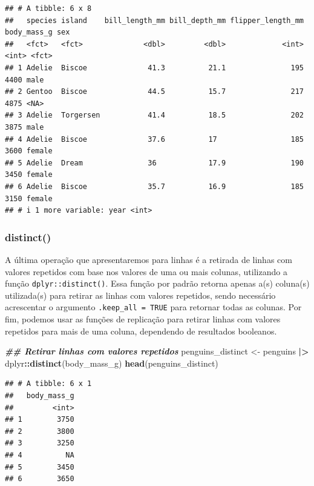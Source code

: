 \documentclass[
]{article}
\newenvironment{Shaded}{\begin{snugshade}}{\end{snugshade}}
\newcommand{\DocumentationTok}[1]{\textcolor[rgb]{0.56,0.35,0.01}{\textbf{\textit{#1}}}}
\newcommand{\FunctionTok}[1]{\textcolor[rgb]{0.13,0.29,0.53}{\textbf{#1}}}
\newcommand{\NormalTok}[1]{#1}
\newcommand{\OtherTok}[1]{\textcolor[rgb]{0.56,0.35,0.01}{#1}}
\newcommand{\SpecialCharTok}[1]{\textcolor[rgb]{0.81,0.36,0.00}{\textbf{#1}}}
\begin{document}
\begin{verbatim}
## # A tibble: 6 x 8
##   species island    bill_length_mm bill_depth_mm flipper_length_mm body_mass_g sex   
##   <fct>   <fct>              <dbl>         <dbl>             <int>       <int> <fct> 
## 1 Adelie  Biscoe              41.3          21.1               195        4400 male  
## 2 Gentoo  Biscoe              44.5          15.7               217        4875 <NA>  
## 3 Adelie  Torgersen           41.4          18.5               202        3875 male  
## 4 Adelie  Biscoe              37.6          17                 185        3600 female
## 5 Adelie  Dream               36            17.9               190        3450 female
## 6 Adelie  Biscoe              35.7          16.9               185        3150 female
## # i 1 more variable: year <int>
\end{verbatim}

\hypertarget{distinct}{%
\subsubsection{distinct()}\label{distinct}}

A última operação que apresentaremos para linhas é a retirada de linhas com valores repetidos com base nos valores de uma ou mais colunas, utilizando a função \texttt{dplyr::distinct()}. Essa função por padrão retorna apenas a(s) coluna(s) utilizada(s) para retirar as linhas com valores repetidos, sendo necessário acrescentar o argumento \texttt{.keep\_all\ =\ TRUE} para retornar todas as colunas. Por fim, podemos usar as funções de replicação para retirar linhas com valores repetidos para mais de uma coluna, dependendo de resultados booleanos.

\begin{Shaded}
\begin{Highlighting}[]
\DocumentationTok{\#\# Retirar linhas com valores repetidos}
\NormalTok{penguins\_distinct }\OtherTok{\textless{}{-}}\NormalTok{ penguins }\SpecialCharTok{|\textgreater{}} 
\NormalTok{    dplyr}\SpecialCharTok{::}\FunctionTok{distinct}\NormalTok{(body\_mass\_g)}
\FunctionTok{head}\NormalTok{(penguins\_distinct)}
\end{Highlighting}
\end{Shaded}

\begin{verbatim}
## # A tibble: 6 x 1
##   body_mass_g
##         <int>
## 1        3750
## 2        3800
## 3        3250
## 4          NA
## 5        3450
## 6        3650
\end{verbatim}
\end{document}
